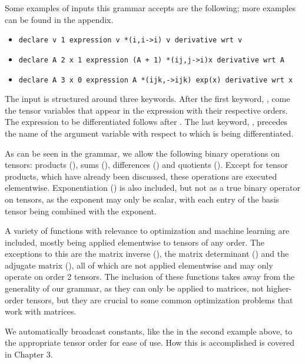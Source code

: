 \documentclass[12pt, a4paper]{report}
\begin{document}
Some examples of inputs this grammar accepts are the following; more examples can be found in the appendix.

\begin{itemize}
    \item \texttt{declare v 1 expression v *(i,i->i) v derivative wrt v}
    \item \texttt{declare A 2 x 1 expression (A + 1) *(ij,j->i)x derivative wrt A}
    \item \texttt{declare A 3 x 0 expression A *(ijk,->ijk) exp(x) derivative wrt x}
\end{itemize}

The input is structured around three keywords.
After the first keyword, , come the tensor variables that appear in the expression with their respective orders.
The expression to be differentiated follows after .
The last keyword, , precedes the name of the argument variable with respect to which is being differentiated.

As can be seen in the grammar, we allow the following binary operations on tensors: products (\codeword{*(,->)}), sums (\codeword{+}), differences (\codeword{-}) and quotients (\codeword{/}).
Except for tensor products, which have already been discussed, these operations are executed elementwise.
Exponentiation (\codeword{^}) is also included, but not as a true binary operator on tensors, as the exponent may only be scalar, with each entry of the basis tensor being combined with the exponent.

A variety of functions with relevance to optimization and machine learning are included, mostly being applied elementwise to tensors of any order.
The exceptions to this are the matrix inverse (), the matrix determinant () and the adjugate matrix (), all of which are not applied elementwise and may only operate on order 2 tensors.
The inclusion of these functions takes away from the generality of our grammar, as they can only be applied to matrices, not higher-order tensors, but they are crucial to some common optimization problems that work with matrices.

We automatically broadcast constants, like the  in the second example above, to the appropriate tensor order for ease of use.
How this is accomplished is covered in Chapter 3.
\end{document}
